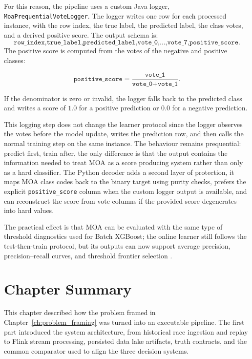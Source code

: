 For this reason, the pipeline uses a custom Java logger, \texttt{MoaPrequentialVoteLogger}. The logger writes one row for each processed instance, with the row index, the
true label, the predicted label, the class votes, and a derived positive score. The output schema is:
\[
    \texttt{row\_index,true\_label,predicted\_label,vote\_0,\ldots,vote\_7,positive\_score}.
\]
The positive score is computed from the votes of the negative and positive classes:

\[
    \texttt{positive\_score} = \frac{\texttt{vote\_1}}{\texttt{vote\_0} + \texttt{vote\_1}}.
\]

If the denominator is zero or invalid, the logger falls back to the predicted class and writes a score of $1.0$ for a positive prediction or $0.0$ for a negative prediction.

This logging step does not change the learner protocol since the logger observes the votes before the model update, writes the prediction row, and then calls the normal
training step on the same instance. The behaviour remains prequential: predict first, train after, the only difference is that the output contains the information needed
to treat MOA as a score producing system rather than only as a hard classifier.
The Python decoder adds a second layer of protection, it maps MOA class codes back to the binary target using purity checks, prefers the explicit \texttt{positive\_score}
column when the custom logger output is available, and can reconstruct the score from vote columns if the provided score degenerates into hard values.

The practical effect is that MOA can be evaluated with the same type of threshold diagnostics used for Batch XGBoost; the online learner still follows the test-then-train
protocol, but its outputs can now support average precision, precision--recall curves, and threshold frontier selection \cite{bifet2010moa,saito2015prroc,davis2006relationship}.



\section{Chapter Summary}

This chapter described how the problem framed in Chapter~\ref{ch:problem_framing} was turned into an executable pipeline. The first part introduced the system architecture,
from historical race ingestion and replay to Flink stream processing, persisted data lake artifacts, truth contracts, and the common comparator used to align the three decision systems.

